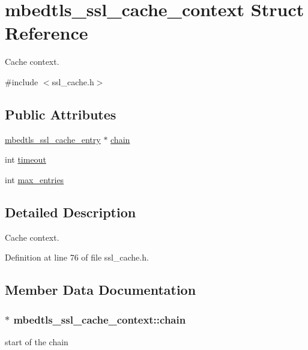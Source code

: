 \hypertarget{structmbedtls__ssl__cache__context}{\section{mbedtls\-\_\-ssl\-\_\-cache\-\_\-context Struct Reference}
\label{structmbedtls__ssl__cache__context}
}


Cache context.  




{\ttfamily \#include $<$ssl\-\_\-cache.\-h$>$}

\subsection*{Public Attributes}
\begin{DoxyCompactItemize}
\item 
\hyperlink{structmbedtls__ssl__cache__entry}{mbedtls\-\_\-ssl\-\_\-cache\-\_\-entry} $\ast$ \hyperlink{structmbedtls__ssl__cache__context_a2039e68fc448803446e536e379638acb}{chain}
\item 
int \hyperlink{structmbedtls__ssl__cache__context_af5d2f556c477eb510117b4a34c02dba4}{timeout}
\item 
int \hyperlink{structmbedtls__ssl__cache__context_a5a490fa803aa85541cab7808db43c477}{max\-\_\-entries}
\end{DoxyCompactItemize}


\subsection{Detailed Description}
Cache context. 

Definition at line 76 of file ssl\-\_\-cache.\-h.



\subsection{Member Data Documentation}
\hypertarget{structmbedtls__ssl__cache__context_a2039e68fc448803446e536e379638acb}{
\subsubsection[{chain}]{$\ast$ mbedtls\-\_\-ssl\-\_\-cache\-\_\-context\-::chain}}\label{structmbedtls__ssl__cache__context_a2039e68fc448803446e536e379638acb}
start of the chain 

